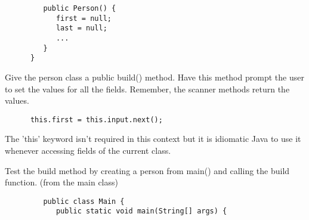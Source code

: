 \documentclass[../../main.tex]{subfiles}
\begin{document}
\begin{steps}
\begin{verbatim}
         public Person() {
            first = null;
            last = null;
            ...
         }
      }
      \end{verbatim}

      \item Give the person class a public build() method. Have this method prompt the user
         to set the values for all the fields. Remember, the scanner methods return the values.
      \begin{verbatim}
      this.first = this.input.next();
      \end{verbatim}
         The 'this' keyword isn't required in this context but it is idiomatic Java to use it
         whenever accessing fields of the current class.
      \item Test the build method by creating a person from main() and calling the build
         function. (from the main class)
      \begin{verbatim}
         public class Main {
            public static void main(String[] args) {
      \end{verbatim}
      \vspace{.5cm}
      \underline{\hspace{15cm}}\\
      \vspace{.5cm}\\
      \underline{\hspace{15cm}}


\end{steps}
\end{document}
